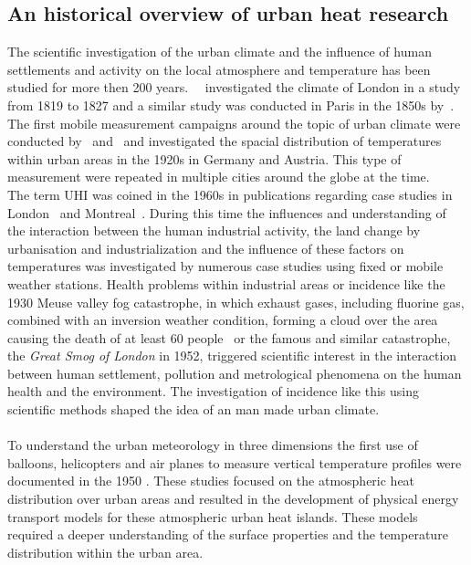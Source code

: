 \documentclass[12pt,a4paper, english,twoside]{article}
\begin{document}
 \subsection{An historical overview of urban heat research}
  The scientific investigation of the urban climate and the influence of human settlements and activity on the local atmosphere and temperature has been studied for more then 200 years.~%
  \cite{Howard1833}~investigated the climate of London in a study from 1819 to 1827 and a similar study was conducted in Paris in the 1850s by~\cite{renou1862differences}.~%
  The first mobile measurement campaigns around the topic of urban climate were conducted by~\cite{peppler1929auto} and~\cite{tollner1932untersuchungen} and investigated the spacial distribution of temperatures within urban areas  in the 1920s in Germany and Austria. 
  This type of measurement were repeated in multiple cities around the globe at the time.\\
  The term \gls{UHI} was coined in the 1960s in publications regarding case studies in London~\autocite{Chandler1961} and Montreal~\autocite{Oke1968}.
  During this time the influences and understanding of the interaction between the human industrial activity, the land change by urbanisation and industrialization and the influence of these factors on temperatures was investigated by numerous case studies using fixed or mobile weather stations.
  Health problems within industrial areas or incidence like the 1930 Meuse valley fog catastrophe, in which exhaust gases, including fluorine gas, combined with an inversion weather condition, forming a cloud over the area causing the death of at least 60 people~\autocite{Nemery2001} or 
  the famous and similar catastrophe, the \textit{Great Smog of London} in 1952, triggered scientific interest in the interaction between human settlement, pollution and metrological phenomena on the human health and the environment. 
  The investigation of incidence like this using scientific methods shaped the idea of an man made urban climate.\\ \\ 
%
  To understand the urban meteorology in three dimensions the first use of balloons, helicopters and air planes to measure vertical temperature profiles were documented in the 1950 \autocite{Duckworth1954}.
  These studies focused on the atmospheric heat distribution over urban areas and resulted in the development of physical energy transport models for these atmospheric urban heat islands.
  These models required a deeper understanding of the surface properties and the temperature distribution within the urban area.\\ \\
\end{document}
